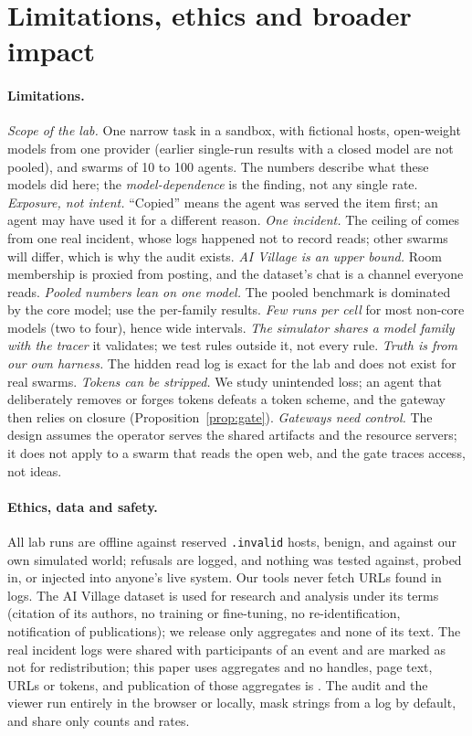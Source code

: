 \section{Limitations, ethics and broader impact}\label{sec:limits}

\paragraph{Limitations.}
\emph{Scope of the lab.} One narrow task in a sandbox, with fictional hosts, open-weight models from one provider (earlier single-run results with a closed model are not pooled), and swarms of 10 to 100 agents. The numbers describe what these models did here; the \emph{model-dependence} is the finding, not any single rate. \emph{Exposure, not intent.} ``Copied'' means the agent was served the item first; an agent may have used it for a different reason. \emph{One incident.} The ceiling of \bestTop{} comes from one real incident, whose logs happened not to record reads; other swarms will differ, which is why the audit exists. \emph{AI Village is an upper bound.} Room membership is proxied from posting, and the dataset's chat is a channel everyone reads. \emph{Pooled numbers lean on one model.} The pooled benchmark is dominated by the core model; use the per-family results. \emph{Few runs per cell} for most non-core models (two to four), hence wide intervals. \emph{The simulator shares a model family with the tracer} it validates; we test rules outside it, not every rule. \emph{Truth is from our own harness.} The hidden read log is exact for the lab and does not exist for real swarms. \emph{Tokens can be stripped.} We study unintended loss; an agent that deliberately removes or forges tokens defeats a token scheme, and the gateway then relies on closure (Proposition~\ref{prop:gate}). \emph{Gateways need control.} The design assumes the operator serves the shared artifacts and the resource servers; it does not apply to a swarm that reads the open web, and the gate traces access, not ideas.

\paragraph{Ethics, data and safety.}\label{sec:ethics}
All lab runs are offline against reserved \texttt{.invalid} hosts, benign, and against our own simulated world; refusals are logged, and nothing was tested against, probed in, or injected into anyone's live system. Our tools never fetch URLs found in logs. The AI Village dataset is used for research and analysis under its terms (citation of its authors, no training or fine-tuning, no re-identification, notification of publications); we release only aggregates and none of its text. The real incident logs were shared with participants of an event and are marked as not for redistribution; this paper uses aggregates and no handles, page text, URLs or tokens, and publication of those aggregates is . The audit and the viewer run entirely in the browser or locally, mask strings from a log by default, and share only counts and rates.

